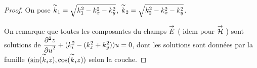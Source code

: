     \begin{proof}

      On pose \(\kk_1 = \sqrt{k_1^2 - k_x^2 - k_y^2}\),  \(\kk_2 = \sqrt{k_2^2 - k_x^2 - k_y^2}\).

      On remarque que toutes les composantes du champs \(\vE\) ( idem pour \(\vH\) ) sont solutions de \(\ddr[2]{u}{z} + (k_i^2 - ( k_x^2 + k_y^2 ) ) u = 0 \), dont les solutions sont données par la famille \((\sin(\kk_i z),\cos(\kk_i z))\) selon la couche.




\end{proof}
